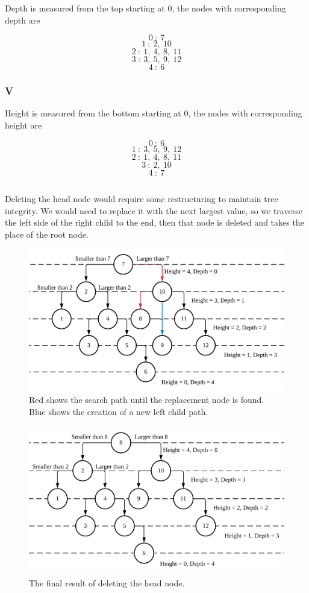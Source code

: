 \documentclass[journal]{IEEEtran}
\begin{document}
Depth is measured from the top starting at 0, the nodes with corresponding depth are

$$0~:~7$$
$$1~:~2,~10$$
$$2~:~1,~4,~8,~11$$
$$3~:~3,~5,~9,~12$$
$$4~:~6$$

\subsubsection*{V}

Height is measured from the bottom starting at 0, the nodes with corresponding height are

$$0~:~6$$
$$1~:~3,~5,~9,~12$$
$$2~:~1,~4,~8,~11$$
$$3~:~2,~10$$
$$4~:~7$$


\subsection{}

Deleting the head node would require some restructuring to maintain tree integrity. 
We would need to replace it with the next largest value, so we traverse the 
left side of the right child to the end, then that node is deleted and takes 
the place of the root node.

\begin{figure}[h!]
	\includegraphics[scale = 0.13]{btp.png}
	\caption{Red shows the search path until the replacement node is found. \\ Blue shows the creation of a new left child path.}
\end{figure}
\begin{figure}[h!]
	\includegraphics[scale = 0.13]{btr.png}
	\caption{The final result of deleting the head node.}
\end{figure}
\end{document}
